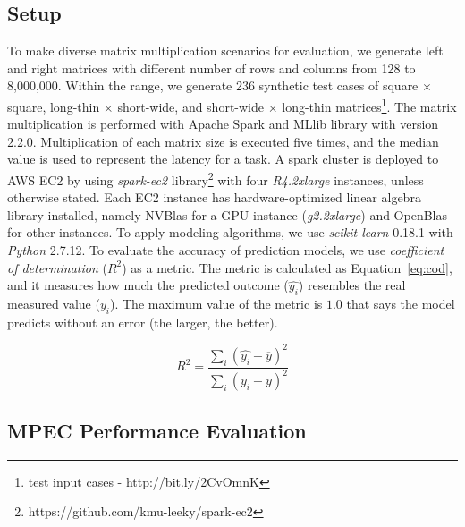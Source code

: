 \documentclass[10pt, conference, compsocconf]{IEEEtran}
\begin{document}
\subsection{Setup}
To make diverse matrix multiplication scenarios for evaluation, we generate left and right matrices with different number of rows and columns from 128 to 8,000,000. Within the range, we generate 236 synthetic test cases of square $\times$ square, long-thin $\times$ short-wide, and short-wide $\times$ long-thin matrices\footnote{test input cases - http://bit.ly/2CvOmnK}. The matrix multiplication is performed with Apache Spark and MLlib library with version 2.2.0. Multiplication of each matrix size is executed five times, and the median value is used to represent the latency for a task. A spark cluster is deployed to AWS EC2 by using \textit{spark-ec2} library\footnote{https://github.com/kmu-leeky/spark-ec2} with four \textit{R4.2xlarge} instances, unless otherwise stated. Each EC2 instance has hardware-optimized linear algebra library installed, namely NVBlas for a GPU instance (\textit{g2.2xlarge}) and OpenBlas for other instances. To apply modeling algorithms, we use \textit{scikit-learn} 0.18.1 with \textit{Python} 2.7.12. To evaluate the accuracy of prediction models, we use \textit{coefficient of determination} ($R^2$) as a metric. The metric is calculated as Equation~\ref{eq:cod}, and it measures how much the predicted outcome ($\hat{y_i}$) resembles the real measured value ($y_i$). The maximum value of the metric is $1.0$ that says the model predicts without an error (the larger, the better).

\begin{equation}\label{eq:cod}
  R^2 = \frac{\sum\limits_{i} (\hat{y_i}-\overline{y})^2}{\sum\limits_{i} (y_i-\overline{y})^2}
\end{equation}


\subsection{MPEC Performance Evaluation}
\end{document}
